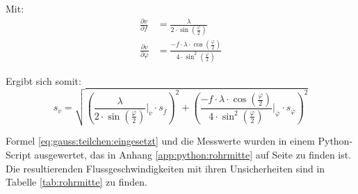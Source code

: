 Mit:
\begin{align}
    \label{eq:partials}
    \frac{\partial v}{\partial f}       &= \frac{\lambda}{2 \cdot \sin \left( \frac{\varphi}{2} \right) } \\
    \frac{\partial v}{\partial \varphi} &= \frac{-f \cdot \lambda \cdot \cos\left(\frac{\varphi}{2}\right)}{4 \cdot \sin^2\left(\frac{\varphi}{2}\right)}
\end{align}

Ergibt sich somit:
\begin{equation}
    \label{eq:gauss:teilchen:eingesetzt}
    s_{\overline{v}} = \sqrt{ \left( \frac{\lambda}                                                    {2 \cdot \sin  \left( \frac{\varphi}{2} \right)} \biggr\rvert_{\overline{v}}       \cdot s_{\overline{f}}       \right)^2
                            + \left( \frac{-f \cdot \lambda \cdot \cos\left( \frac{\varphi}{2} \right)}{4 \cdot \sin^2\left( \frac{\varphi}{2} \right)} \biggr\rvert_{\overline{\varphi}} \cdot s_{\overline{\varphi}} \right)^2
                            }
\end{equation}

Formel   \ref{eq:gauss:teilchen:eingesetzt}  und   die  Messwerte   wurden  in
einem  Python-Script  ausgewertet,  das in  Anhang  \ref{app:python:rohrmitte}
auf  Seite \pageref{app:python:rohrmitte}  zu  finden ist. Die  resultierenden
Flussgeschwindigkeiten    mit   ihren    Unsicherheiten   sind    in   Tabelle
\ref{tab:rohrmitte} zu finden.

